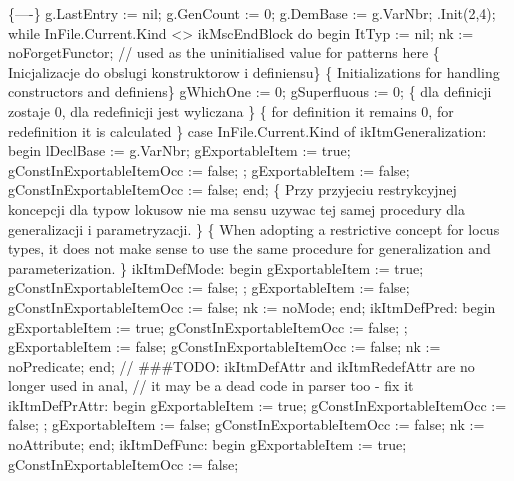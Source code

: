    \{----\}
   g.LastEntry := nil;
   g.GenCount := 0;
   g.DemBase := g.VarNbr;
   .Init(2,4);
   while InFile.Current.Kind <> ikMscEndBlock do
   begin
      ItTyp := nil;
      nk := noForgetFunctor; // used as the uninitialised value for patterns here
      \{ Inicjalizacje do obslugi konstruktorow i definiensu\}
      \{ Initializations for handling constructors and definiens\}
      gWhichOne := 0;
      gSuperfluous := 0; \{ dla definicji zostaje 0, dla redefinicji jest wyliczana \}
                         \{ for definition it remains 0, for redefinition it is calculated \}
      case InFile.Current.Kind of
         ikItmGeneralization:
            begin lDeclBase := g.VarNbr;
            gExportableItem := true;
            gConstInExportableItemOcc := false;
            ;
            gExportableItem := false;
            gConstInExportableItemOcc := false;
            end;
         \{ Przy przyjeciu restrykcyjnej koncepcji dla typow lokusow nie ma sensu
           uzywac tej samej procedury dla generalizacji i parametryzacji.
         \}
         \{ When adopting a restrictive concept for locus types, it does not make sense
           to use the same procedure for generalization and parameterization. \}
         ikItmDefMode:
            begin
               gExportableItem := true;
               gConstInExportableItemOcc := false;
               ;
               gExportableItem := false;
               gConstInExportableItemOcc := false;
               nk := noMode;
            end;
         ikItmDefPred:
            begin
               gExportableItem := true;
               gConstInExportableItemOcc := false;
               ;
               gExportableItem := false;
               gConstInExportableItemOcc := false;
               nk := noPredicate;
            end;
         // ###TODO: ikItmDefAttr and ikItmRedefAttr are no longer used in anal,
         //           it may be a dead code in parser too - fix it
         ikItmDefPrAttr:
            begin
               gExportableItem := true;
               gConstInExportableItemOcc := false;
               ;
               gExportableItem := false;
               gConstInExportableItemOcc := false;
               nk := noAttribute;
            end;
         ikItmDefFunc:
            begin
               gExportableItem := true;
               gConstInExportableItemOcc := false;
